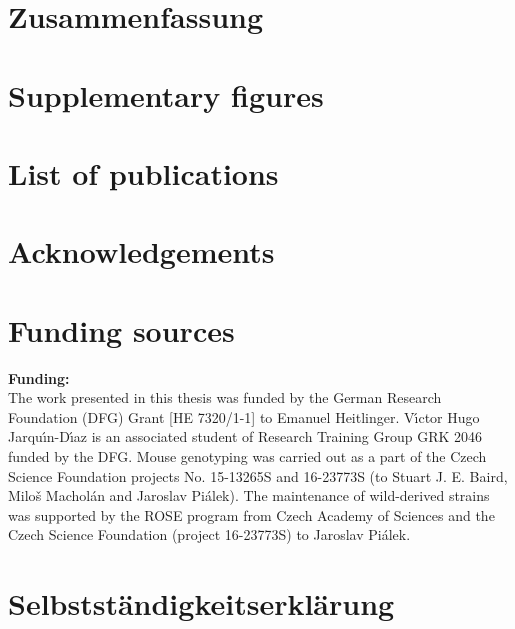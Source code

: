 \documentclass[11pt]{report}
\numberwithin{equation}{section} %
\begin{document}
\chapter*{Zusammenfassung}


\newpage
\printbibliography[heading=bibintoc]

\chapter*{Supplementary figures}


\chapter*{List of publications}


\chapter*{Acknowledgements}


\chapter*{Funding sources}

\textbf{Funding:}\\

The work presented in this thesis was funded by the German Research Foundation (DFG) Grant [HE 7320/1-1] to Emanuel Heitlinger. V{\'{\i}}ctor Hugo Jarqu{\'{\i}}n-D{\'{\i}}az is an associated student of Research Training Group GRK 2046 funded by the DFG. Mouse genotyping was carried out as a part of the Czech Science Foundation projects No. 15-13265S and 16-23773S (to Stuart J. E. Baird, Milo{\v{s}} Machol{\'{a}}n and Jaroslav Pi{\'{a}}lek). The maintenance of wild-derived strains was supported by the ROSE program from Czech Academy of Sciences and the Czech Science Foundation (project 16-23773S) to Jaroslav Pi{\'{a}}lek.

\chapter*{Selbstständigkeitserklärung}

\end{document}
